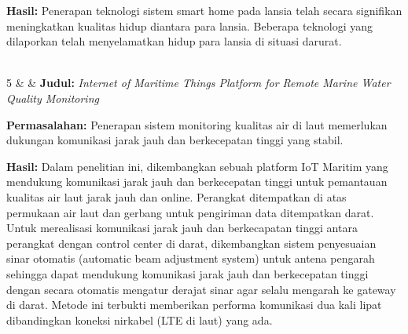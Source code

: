 \begin{longtable}[!h]
        \textbf{Hasil:} Penerapan teknologi sistem smart home pada lansia telah secara signifikan meningkatkan kualitas hidup diantara para lansia. Beberapa teknologi yang dilaporkan telah menyelamatkan hidup para lansia di situasi darurat. 
        
        \\ 

        5
        & \textcite{article:song} 
        &   
        \textbf{Judul:} \textit{Internet of Maritime Things Platform for Remote Marine Water Quality Monitoring}

        \textbf{Permasalahan:} Penerapan sistem monitoring kualitas air di laut memerlukan dukungan komunikasi jarak jauh dan berkecepatan tinggi yang stabil.

        \textbf{Hasil:} Dalam penelitian ini, dikembangkan sebuah platform IoT Maritim yang mendukung komunikasi jarak jauh dan berkecepatan tinggi untuk pemantauan kualitas air laut jarak jauh dan online. Perangkat ditempatkan di atas permukaan air laut dan gerbang untuk pengiriman data ditempatkan darat. Untuk merealisasi komunikasi jarak jauh dan berkecapatan tinggi antara perangkat dengan control center di darat, dikembangkan sistem penyesuaian sinar otomatis (automatic beam adjustment system) untuk antena pengarah sehingga dapat mendukung komunikasi jarak jauh dan berkecepatan tinggi dengan secara otomatis mengatur derajat sinar agar selalu mengarah ke gateway di darat. Metode ini terbukti memberikan performa komunikasi dua kali lipat dibandingkan koneksi nirkabel (LTE di laut) yang ada.
        
        \\
        \bottomrule
     \caption{Penelitian terdahulu mengenai \textit{Internet of Things} (IoT)}
     \label{tab:prev-research}
\end{longtable}